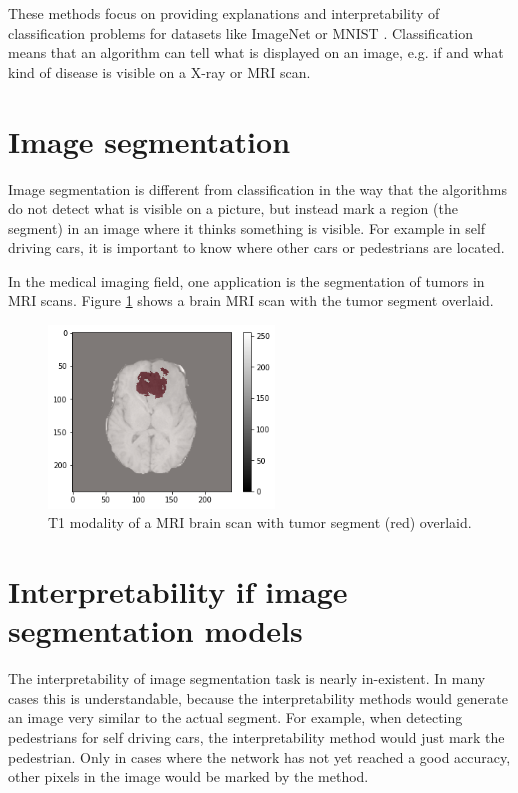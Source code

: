 These methods focus on providing explanations and interpretability of classification problems for datasets like ImageNet \cite{imagenet_cvpr09} or MNIST \cite{lecun1998gradient}. Classification means that an algorithm can tell what is displayed on an image, e.g. if and what kind of disease is visible on a X-ray or MRI scan.

\section{Image segmentation}
Image segmentation is different from classification in the way that the algorithms do not detect what is visible on a picture, but instead mark a region (the segment) in an image where it thinks something is visible. For example in self driving cars, it is important to know where other cars or pedestrians are located. 

In the medical imaging field, one application is the segmentation of tumors in MRI scans. Figure \ref{introduction_tumor} shows a brain MRI scan with the tumor segment overlaid.

\begin{figure}[h]
\centering
\includegraphics[width=6cm]{chapters/01_introduction/images/tumor_segment.png}
\caption{T1 modality of a MRI brain scan with tumor segment (red) overlaid.}
\label{introduction_tumor}
\end{figure}


\section{Interpretability if image segmentation models}
The interpretability of image segmentation task is nearly in-existent. In many cases this is understandable, because the interpretability methods would generate an image very similar to the actual segment. For example, when detecting pedestrians for self driving cars, the interpretability method would just mark the pedestrian. Only in cases where the network has not yet reached a good accuracy, other pixels in the image would be marked by the method.

